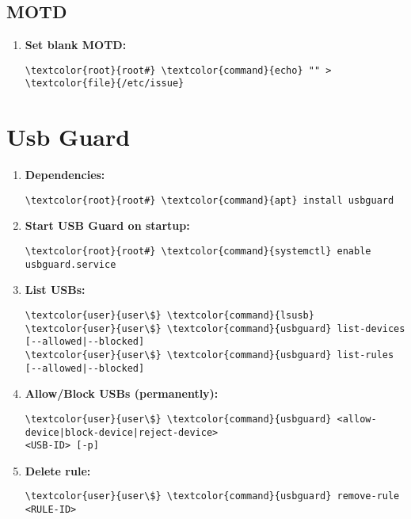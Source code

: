\documentclass[10pt, a4paper, onecolumn, openany]{book} %
\begin{document}
\subsection{MOTD}
\begin{enumerate}
    \item \textbf{Set blank MOTD:}
\begin{Verbatim}[commandchars=\\\{\}]
\textcolor{root}{root#} \textcolor{command}{echo} "" > \textcolor{file}{/etc/issue}
\end{Verbatim}
\end{enumerate}
\section{Usb Guard}
\begin{enumerate}
    \item \textbf{Dependencies:}
\begin{Verbatim}[commandchars=\\\{\}]
\textcolor{root}{root#} \textcolor{command}{apt} install usbguard
\end{Verbatim}
    \item \textbf{Start USB Guard on startup:}
\begin{Verbatim}[commandchars=\\\{\}]
\textcolor{root}{root#} \textcolor{command}{systemctl} enable usbguard.service
\end{Verbatim}
    \item \textbf{List USBs:}
\begin{Verbatim}[commandchars=\\\{\}]
\textcolor{user}{user\$} \textcolor{command}{lsusb}
\textcolor{user}{user\$} \textcolor{command}{usbguard} list-devices [--allowed|--blocked]
\textcolor{user}{user\$} \textcolor{command}{usbguard} list-rules [--allowed|--blocked]
\end{Verbatim}
    \item \textbf{Allow/Block USBs (permanently):}
\begin{Verbatim}[commandchars=\\\{\}]
\textcolor{user}{user\$} \textcolor{command}{usbguard} <allow-device|block-device|reject-device>
<USB-ID> [-p]
\end{Verbatim}
    \item \textbf{Delete rule:}
\begin{Verbatim}[commandchars=\\\{\}]
\textcolor{user}{user\$} \textcolor{command}{usbguard} remove-rule <RULE-ID>
\end{Verbatim}
\end{enumerate}
\end{document}
